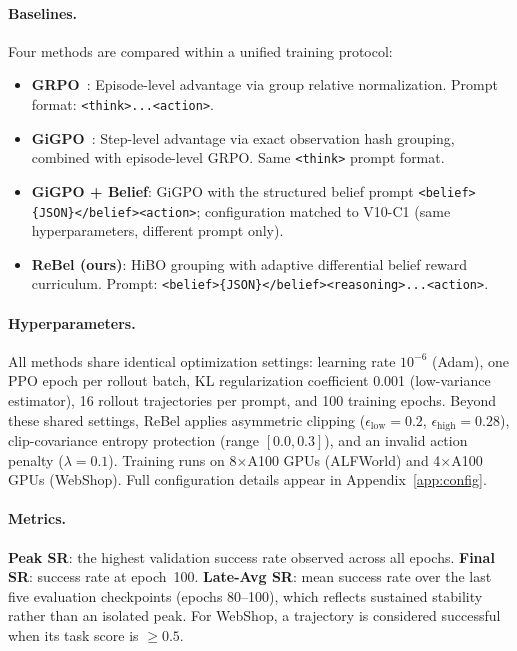 \paragraph{Baselines.}
Four methods are compared within a unified training protocol:
\begin{itemize}[leftmargin=1.5em,itemsep=2pt]
  \item \textbf{GRPO}~\citep{shao2024deepseekmath}: Episode-level advantage via
    group relative normalization.
    Prompt format: \texttt{<think>...<action>}.
  \item \textbf{GiGPO}~\citep{feng2025gigpo}: Step-level advantage via exact
    observation hash grouping, combined with episode-level GRPO.
    Same \texttt{<think>} prompt format.
  \item \textbf{GiGPO + Belief}: GiGPO with the structured belief
    prompt \texttt{<belief>\{JSON\}</belief><action>}; configuration
    matched to V10-C1 (same hyperparameters, different prompt only).
  \item \textbf{ReBel (ours)}: HiBO grouping with adaptive differential belief
    reward curriculum.
    Prompt: \texttt{<belief>\{JSON\}</belief><reasoning>...<action>}.
\end{itemize}

\paragraph{Hyperparameters.}
All methods share identical optimization settings: learning rate $10^{-6}$ (Adam),
one PPO epoch per rollout batch, KL regularization coefficient 0.001
(low-variance estimator), 16 rollout trajectories per prompt, and 100 training
epochs.
Beyond these shared settings, ReBel applies asymmetric clipping
($\epsilon_{\text{low}}=0.2$, $\epsilon_{\text{high}}=0.28$), clip-covariance
entropy protection (range $[0.0, 0.3]$), and an invalid action penalty
($\lambda=0.1$).
Training runs on 8$\times$A100 GPUs (ALFWorld) and 4$\times$A100 GPUs (WebShop).
Full configuration details appear in Appendix~\ref{app:config}.

\paragraph{Metrics.}
\textbf{Peak SR}: the highest validation success rate observed across all epochs.
\textbf{Final SR}: success rate at epoch~100.
\textbf{Late-Avg SR}: mean success rate over the last five evaluation checkpoints
(epochs 80--100), which reflects sustained stability rather than an isolated peak.
For WebShop, a trajectory is considered successful when its task score is
$\geq 0.5$.


